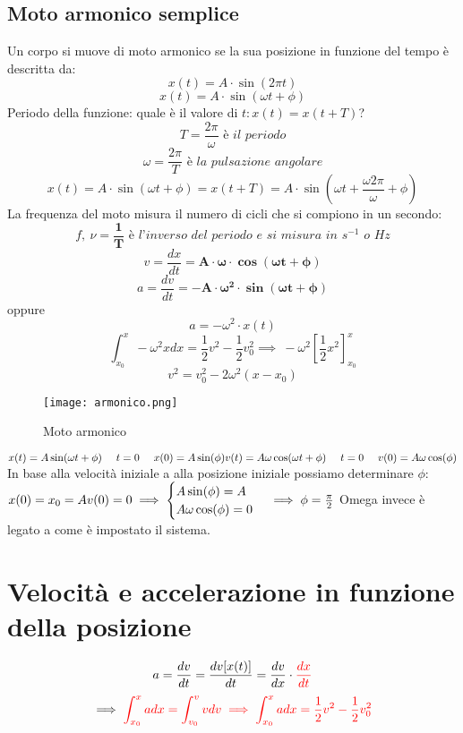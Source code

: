 \documentclass[../../main.tex]{subfiles}
\begin{document}
\subsection{Moto armonico semplice}
Un corpo si muove di moto armonico se la sua posizione in funzione del tempo è descritta da:
\[
    x(t) = A \cdot \sin(2\pi t)
\]
\[
    x(t) = A \cdot \sin(\omega t + \phi)
\]
Periodo della funzione: quale è il valore di $t : x(t) = x(t + T)$?
\[
    T = \dfrac{2\pi}{\omega} \textit{ è il periodo}
\]
\[
    \omega = \dfrac{2\pi}{T} \textit{ è la pulsazione angolare}
\]
\[
    x(t) = A \cdot \sin(\omega t + \phi) = x(t+T) = A \cdot \sin(\omega t+\dfrac{\omega2\pi}{\omega}+\phi)
\]
La frequenza del moto misura il numero di cicli che si compiono in un secondo:
\[
    f, \ \nu = \mathbf{\dfrac{1}{T}} \textit{ è l'inverso del periodo e si misura in } s^{-1} \textit{ o } Hz
\]
\[
    v = \dfrac{dx}{dt} = \mathbf{A \cdot \omega \cdot \cos(\omega t + \phi)}
\]
\[
    a = \dfrac{dv}{dt} = \mathbf{-A \cdot \omega^2 \cdot \sin(\omega t + \phi)}
\]
oppure
\[
    a = -\omega^2 \cdot x(t)
\]
\[
    \int_{x_0}^{x} -\omega^2xdx = \dfrac{1}{2} v^2 - \dfrac{1}{2}v_0^2 \implies \ -\omega^2[\frac{1}{2}x^2]_{x_0}^{x}
\]
\[
    v^2 = v_0^2 - 2\omega^2(x-x_0)
\]
\begin{figure}[h!]
    \centering
    \texttt{[image: armonico.png]}
    \caption{Moto armonico}
\end{figure}
\begin{math}
    x(t) = A\sin(\omega t + \phi) \ \ \ \ t = 0 \ \ \ \ x(0) = A\sin(\phi) \\
    v(t) = A\omega\cos(\omega t + \phi) \ \ \ \ t = 0 \ \ \ \ v(0) = A\omega\cos(\phi)
\end{math}
\\In base alla velocità iniziale a alla posizione iniziale possiamo determinare $\phi$:
\begin{math}
    x(0) = x_0 = A \\
    v(0) = 0
    \implies \begin{cases}
        A\sin(\phi) = A \\
        A\omega\cos(\phi) = 0
    \end{cases}
    \implies \phi = \frac{\pi}{2}
\end{math}
Omega invece è legato a come è impostato il sistema.

\section{Velocità e accelerazione in funzione della posizione}
\[
    a = \dfrac{dv}{dt} = \dfrac{dv[x(t)]}{dt} = \dfrac{dv}{dx} \cdot \textcolor{red}{\dfrac{dx}{dt}}
\]
\[
    \implies \textcolor{red}{\int_{x_0}^x adx = \int_{v_0}^v vdv \implies \int_{x_0}^x adx = \frac{1}{2}v^2 - \frac{1}{2}v_0^2}
\]
\end{document}
